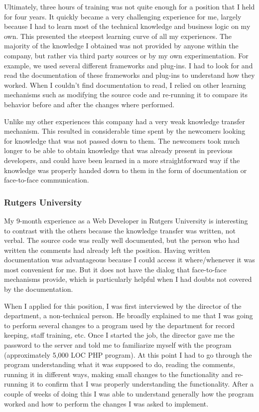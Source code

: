 \documentclass[12pt, letterpaper]{article}
\begin{document}
Ultimately, three hours of training was not quite enough for a position that I held for four
years. It quickly became a very challenging experience for me, largely because I had to learn
most of the technical knowledge and business logic on my own. This presented the steepest learning curve of all my experiences. The 
majority of the knowledge I obtained was not provided by anyone within the company, but rather via third party
sources or by my own experimentation. For example, we used several different frameworks and plug-ins. 
I had to look for and read the documentation of 
these frameworks and plug-ins to understand how they worked. When I couldn't find documentation to read, I relied
on other learning mechanisms such as modifying the source code and re-running it to compare its behavior
before and after the changes where performed. 

Unlike my other experiences this company had a very weak knowledge transfer mechanism.
This resulted in considerable time spent by the newcomers looking for knowledge that was not passed down to them. 
The newcomers took much longer to be able to obtain knowledge that was already present in previous developers,
and could have been learned in a more straightforward way if the knowledge was properly handed down to them 
in the form of documentation or face-to-face communication.

\subsubsection{Rutgers University}
My 9-month experience as a Web Developer in Rutgers University is interesting to contrast with the others because the knowledge 
transfer was written, not verbal. The source code was really well documented, but the person who had 
written the comments had already left the position. Having written documentation was advantageous because 
I could access it where/whenever it was most convenient for me. But it does not have the dialog that face-to-face
mechanisms provide, which is particularly helpful when I had doubts not covered by the documentation. 

When I applied for this position, I was first interviewed by the director of the department, 
a non-technical person. He broadly explained to me that I was going to 
perform several changes to a program used by the department for record keeping,
staff training, etc. Once I started the job, the director gave me the password to the server and told me to familiarize myself with the program (approximately 5,000 LOC PHP program). At this point I had to go through
the program understanding what it was supposed to do, reading the comments, running it in different ways, making small 
changes to the 
functionality and re-running it to confirm that I was properly understanding the functionality. After a couple of 
weeks of doing this I was able to understand generally how the program worked and how to perform the changes I was asked
to implement.
\end{document}
